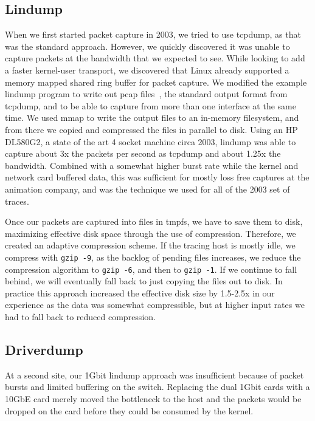 \subsection{Lindump}

When we first started packet capture in 2003, we tried to use tcpdump,
as that was the standard approach.  However, we quickly discovered it
was unable to capture packets at the bandwidth that we expected to
see.  While looking to add a faster kernel-user transport, we
discovered that Linux already supported a memory mapped shared ring
buffer for packet capture. We modified the example lindump program to
write out pcap files~\cite{pcap}, the standard output format from
tcpdump, and to be able to capture from more than one interface at the
same time.  We used mmap to write the output files to an in-memory
filesystem, and from there we copied and compressed the files in
parallel to disk.  Using an HP DL580G2, a state of the art 4 socket
machine circa 2003, lindump was able to capture about 3x the packets
per second as tcpdump and about 1.25x the bandwidth.  Combined with a
somewhat higher burst rate while the kernel and network card buffered
data, this was sufficient for mostly loss free captures at the
animation company, and was the technique we used for all of the 2003
set of traces.

Once our packets are captured into files in tmpfs, we have to save
them to disk, maximizing effective disk space through the use of
compression.  Therefore, we created an adaptive compression scheme.
If the tracing host is mostly idle, we compress with {\tt gzip -9}, as
the backlog of pending files increases, we reduce the compression
algorithm to {\tt gzip -6}, and then to {\tt gzip -1}.  If we continue
to fall behind, we will eventually fall back to just copying the files
out to disk.  In practice this approach increased the effective disk
size by 1.5-2.5x in our experience as the data was somewhat
compressible, but at higher input rates we had to fall back to reduced
compression.

\subsection{Driverdump}

At a second site, our 1Gbit lindump approach was insufficient
because of packet bursts and limited buffering on the switch.
Replacing the dual 1Gbit cards with a 10GbE card merely moved the
bottleneck to the host and the packets would be dropped on the card
before they could be consumed by the kernel.

